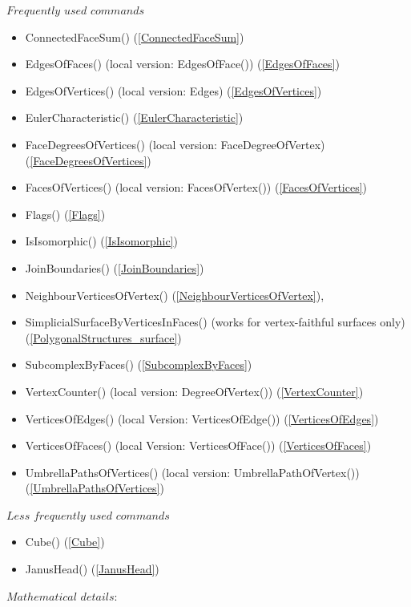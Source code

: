 \documentclass[a4paper,11pt]{report}
\begin{document}
{{ $Frequently$ $used$ $commands$ 
\begin{itemize}
\item  ConnectedFaceSum() (\ref{ConnectedFaceSum}) 
\item  EdgesOfFaces() (local version: EdgesOfFace()) (\ref{EdgesOfFaces}) 
\item  EdgesOfVertices() (local version: Edges) (\ref{EdgesOfVertices}) 
\item  EulerCharacteristic() (\ref{EulerCharacteristic}) 
\item  FaceDegreesOfVertices() (local version: FaceDegreeOfVertex)(\ref{FaceDegreesOfVertices}) 
\item  FacesOfVertices() (local version: FacesOfVertex()) (\ref{FacesOfVertices}) 
\item  Flags() (\ref{Flags}) 
\item  IsIsomorphic() (\ref{IsIsomorphic}) 
\item  JoinBoundaries() (\ref{JoinBoundaries}) 
\item  NeighbourVerticesOfVertex() (\ref{NeighbourVerticesOfVertex}), 
\item  SimplicialSurfaceByVerticesInFaces() (works for vertex-faithful surfaces only)
(\ref{PolygonalStructures_surface}) 
\item  SubcomplexByFaces() (\ref{SubcomplexByFaces}) 
\item  VertexCounter() (local version: DegreeOfVertex()) (\ref{VertexCounter}) 
\item  VerticesOfEdges() (local Version: VerticesOfEdge()) (\ref{VerticesOfEdges}) 
\item  VerticesOfFaces() (local Version: VerticesOfFace()) (\ref{VerticesOfFaces}) 
\item  UmbrellaPathsOfVertices() (local version: UmbrellaPathOfVertex()) (\ref{UmbrellaPathsOfVertices}) 
\end{itemize}
 $Less$ $frequently$ $used$ $commands$ 
\begin{itemize}
\item  Cube() (\ref{Cube}) 
\item  JanusHead() (\ref{JanusHead}) 
\end{itemize}
 

 $ Mathematical$ $details:$ 

}}
\end{document}
